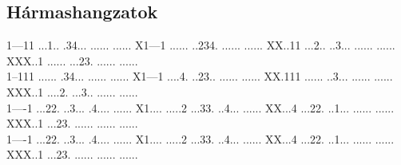 \documentclass[a4paper,11pt]{article}
\begin{document}
\subsection{Hármashangzatok}
           {1---11%
            ...1..%
            .34...%
            ......%
            ......} 
           {X1---1%
            ......%
            ..234.%
            ......%
            ......} 
           {XX..11%
            ...2..%
            ..3...%
            ......%
            ......} 
           {XXX..1%
            ......%
            ...23.%
            ......%
            ......}\\
           {1--111%
            ......%
            .34...%
            ......%
            ......} 
           {X1---1%
            ....4.%
            ..23..%
            ......%
            ......} 
           {XX.111%
            ......%
            ..3...%
            ......%
            ......} 
           {XXX..1%
            ....2.%
            ...3..%
            ......%
            ......}\\
           {1----1%
            ...22.%
            ..3...%
            .4....%
            ......} 
           {X1....%
            .....2%
            ...33.%
            ..4...%
            ......} 
           {XX...4%
            ...22.%
            ..1...%
            ......%
            ......} 
           {XXX..1%
            ...23.%
            ......%
            ......%
            ......}\\
           {1----1%
            ...22.%
            ..3...%
            .4....%
            ......} 
           {X1....%
            .....2%
            ...33.%
            ..4...%
            ......} 
           {XX...4%
            ...22.%
            ..1...%
            ......%
            ......} 
           {XXX..1%
            ...23.%
            ......%
            ......%
            ......}

\newpage
\end{document}
